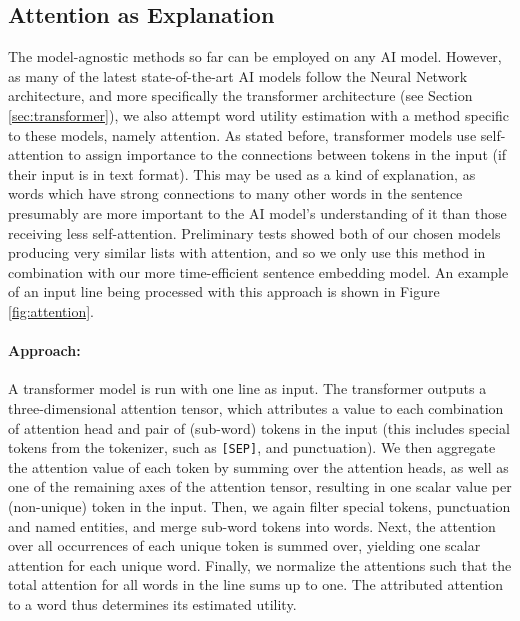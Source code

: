 \subsection{Attention as Explanation}
The model-agnostic methods so far can be employed on any AI model.
However, as many of the latest state-of-the-art AI models follow the Neural Network architecture, and more specifically the transformer architecture (see Section \ref{sec:transformer}), we also attempt word utility estimation with a method specific to these models, namely attention.
As stated before, transformer models use self-attention to assign importance to the connections between tokens in the input (if their input is in text format).
This may be used as a kind of explanation, as words which have strong connections to many other words in the sentence presumably are more important to the AI model's understanding of it than those receiving less self-attention.
Preliminary tests showed both of our chosen models producing very similar lists with attention, and so we only use this method in combination with our more time-efficient sentence embedding model. 
An example of an input line being processed with this approach is shown in Figure \ref{fig:attention}.

\paragraph{Approach:}
A transformer model is run with one line as input.
The transformer outputs a three-dimensional attention tensor, which attributes a value to each combination of attention head and pair of (sub-word) tokens in the input (this includes special tokens from the tokenizer, such as \texttt{[SEP]}, and punctuation).
We then aggregate the attention value of each token by summing over the attention heads, as well as one of the remaining axes of the attention tensor, resulting in one scalar value per (non-unique) token in the input.
Then, we again filter special tokens, punctuation and named entities, and merge sub-word tokens into words.
Next, the attention over all occurrences of each unique token is summed over, yielding one scalar attention for each unique word.
Finally, we normalize the attentions such that the total attention for all words in the line sums up to one.
The attributed attention to a word thus determines its estimated utility.

